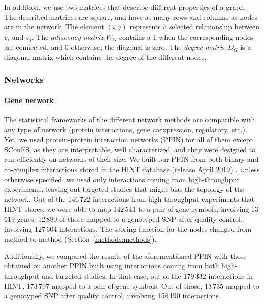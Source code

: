 \documentclass[10pt,letterpaper]{article}
\begin{document}
In addition, we use two matrices that describe different properties of a graph. The described matrices are square, and have as many rows and columns as nodes are in the network. The element $(i,j)$ represents a  selected relationship between $v_i$ and $v_j$. The \emph{adjacency matrix} $W_G$ contains a 1 when the corresponding nodes are connected, and 0 otherwise; the diagonal is zero. The \emph{degree matrix} $D_G$ is a diagonal matrix which contains the degree of the different nodes.

\subsubsection{Networks}
\label{methods:networks}

\paragraph{Gene network}
The statistical frameworks of the different network methods are compatible with any type of network (protein interactions, gene coexpression, regulatory, etc.). Yet, we used protein-protein interaction networks (PPIN) for all of them except SConES, as they are interpretable, well characterized, and they were designed to run efficiently on networks of their size. We built our PPIN from both binary and co-complex interactions stored in the HINT database (release April 2019) \cite{das_hint:_2012}. Unless otherwise specified, we used only interactions coming from high-throughput experiments, leaving out targeted studies that might bias the topology of the network. Out of the 146\,722 interactions from high-throughput experiments that HINT stores, we were able to map 142\,541 to a pair of gene symbols, involving 13\,619 genes. 12\,880 of those mapped to a genotyped SNP after quality control, involving 127\,604 interactions. The scoring function for the nodes changed from method to method (Section~\ref{methods:methods}).

Additionally, we compared the results of the aforementioned PPIN with those obtained on another PPIN built using interactions coming from both high-throughput and targeted studies. In that case, out of the 179\,332 interactions in HINT, 173\,797 mapped to a pair of gene symbols. Out of those, 13\,735 mapped to a genotyped SNP after quality control, involving 156\,190 interactions.
\end{document}
